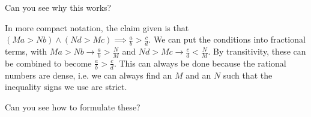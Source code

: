 \documentclass[../the-road-to-reality.tex]{subfiles}
\begin{document}
\begin{questions}
\question Can you see why this works?

\begin{solution}
	In more compact notation, the claim given is that $(Ma > Nb) \wedge (Nd > Mc) \implies \frac{a}{b} > \frac{c}{d}$. We can put the conditions into fractional terms, with $Ma > Nb \to \frac{a}{b} > \frac{N}{M}$ and $Nd > Mc \to \frac{c}{d} < \frac{N}{M}$. By transitivity, these can be combined to become $\frac{a}{b} > \frac{c}{d}$. This can always be done because the rational numbers are dense, i.e. we can always find an $M$ and an $N$ such that the inequality signs we use are strict.
\end{solution}

\question Can you see how to formulate these?

\end{questions}
\end{document}
